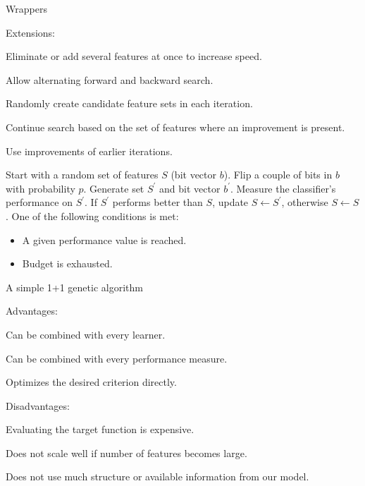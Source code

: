 \begin{vbframe}{Wrappers}
\framebreak

\begin{blocki}{Extensions:}
  \item Eliminate or add several features at once to increase speed.
  \item Allow alternating forward and backward search.
  \item Randomly create candidate feature sets in each iteration.
  \item Continue search based on the set of features where an improvement is present.
  \item Use improvements of earlier iterations.
\end{blocki}

\framebreak

\begin{algorithm}[H]
\begin{algorithmic}[1]
  \State Start with a random set of features $S$ (bit vector $b$).
  \Repeat
  \State Flip a couple of bits in $b$ with probability $p$.
  \State Generate set $S^\prime$ and bit vector $b^\prime$.
  \State Measure the classifier's performance on $S^\prime$.
  \State If $S^\prime$ performs better than $S$, update $S \leftarrow S^\prime$, otherwise $S \leftarrow S$.
  \Until One of the following conditions is met:
    \begin{itemize}
      \item A given performance value is reached.
      \item Budget is exhausted.
    \end{itemize}
    \caption{A simple 1+1 genetic algorithm}
\end{algorithmic}
\end{algorithm}

\framebreak

\begin{blocki}{Advantages:}
  \item Can be combined with every learner.
  \item Can be combined with every performance measure.
  \item Optimizes the desired criterion directly.
\end{blocki}

\lz

\begin{blocki}{Disadvantages:}
  \item Evaluating the target function is expensive.
  \item Does not scale well if number of features becomes large.
  \item Does not use much structure or available information from our model.
\end{blocki}


\end{vbframe}
